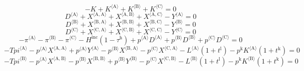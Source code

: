 \begin{equation}
-K + {K}^{\langle \mathrm{A}\rangle} + {K}^{\langle \mathrm{B}\rangle} + {K}^{\langle \mathrm{C}\rangle} = 0
\end{equation}
\begin{equation}
{D}^{\langle \mathrm{A}\rangle} + {X}^{\langle \mathrm{A},\mathrm{A}\rangle} + {X}^{\langle \mathrm{A},\mathrm{B}\rangle} + {X}^{\langle \mathrm{A},\mathrm{C}\rangle} - {Y}^{\langle \mathrm{A}\rangle} = 0
\end{equation}
\begin{equation}
{D}^{\langle \mathrm{B}\rangle} + {X}^{\langle \mathrm{B},\mathrm{A}\rangle} + {X}^{\langle \mathrm{B},\mathrm{B}\rangle} + {X}^{\langle \mathrm{B},\mathrm{C}\rangle} - {Y}^{\langle \mathrm{B}\rangle} = 0
\end{equation}
\begin{equation}
{D}^{\langle \mathrm{C}\rangle} + {X}^{\langle \mathrm{C},\mathrm{A}\rangle} + {X}^{\langle \mathrm{C},\mathrm{B}\rangle} + {X}^{\langle \mathrm{C},\mathrm{C}\rangle} - {Y}^{\langle \mathrm{C}\rangle} = 0
\end{equation}
\begin{equation}
-{\pi}^{\langle \mathrm{A}\rangle} - {\pi}^{\langle \mathrm{B}\rangle} - {\pi}^{\langle \mathrm{C}\rangle} - {H^{\mathrm{inc}}} \left(1 - \tau^{\mathrm{h}}\right) + {{p}^{\langle \mathrm{A}\rangle}} {{D}^{\langle \mathrm{A}\rangle}} + {{p}^{\langle \mathrm{B}\rangle}} {{D}^{\langle \mathrm{B}\rangle}} + {{p}^{\langle \mathrm{C}\rangle}} {{D}^{\langle \mathrm{C}\rangle}} = 0
\end{equation}
\begin{equation}
-{{T\!p\!i}}^{\langle \mathrm{A}\rangle} - {{p}^{\langle \mathrm{A}\rangle}} {{X}^{\langle \mathrm{A},\mathrm{A}\rangle}} + {{p}^{\langle \mathrm{A}\rangle}} {{Y}^{\langle \mathrm{A}\rangle}} - {{p}^{\langle \mathrm{B}\rangle}} {{X}^{\langle \mathrm{B},\mathrm{A}\rangle}} - {{p}^{\langle \mathrm{C}\rangle}} {{X}^{\langle \mathrm{C},\mathrm{A}\rangle}} - {{L}^{\langle \mathrm{A}\rangle}} \left(1 + t^{\mathrm{l}}\right) - {p^{\mathrm{k}}} {{K}^{\langle \mathrm{A}\rangle}} \left(1 + t^{\mathrm{k}}\right) = 0
\end{equation}
\begin{equation}
-{{T\!p\!i}}^{\langle \mathrm{B}\rangle} - {{p}^{\langle \mathrm{A}\rangle}} {{X}^{\langle \mathrm{A},\mathrm{B}\rangle}} - {{p}^{\langle \mathrm{B}\rangle}} {{X}^{\langle \mathrm{B},\mathrm{B}\rangle}} + {{p}^{\langle \mathrm{B}\rangle}} {{Y}^{\langle \mathrm{B}\rangle}} - {{p}^{\langle \mathrm{C}\rangle}} {{X}^{\langle \mathrm{C},\mathrm{B}\rangle}} - {{L}^{\langle \mathrm{B}\rangle}} \left(1 + t^{\mathrm{l}}\right) - {p^{\mathrm{k}}} {{K}^{\langle \mathrm{B}\rangle}} \left(1 + t^{\mathrm{k}}\right) = 0
\end{equation}
